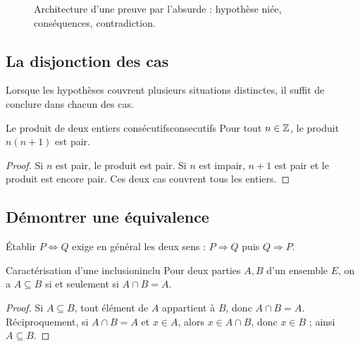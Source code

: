 \begin{figure}[htbp]\centering
{}
\caption{Architecture d'une preuve par l'absurde : hypothèse niée, conséquences, contradiction.}\label{fig:log:absurde}
\end{figure}

\subsection{La disjonction des cas}
Lorsque les hypothèses couvrent plusieurs situations distinctes, il suffit de conclure dans chacun des cas.
\begin{proposition}{Le produit de deux entiers consécutifs}{consecutifs}
Pour tout $n\in\mathbb Z$, le produit $n(n+1)$ est pair.
\end{proposition}
\begin{proof}
Si $n$ est pair, le produit est pair. Si $n$ est impair, $n+1$ est pair et le produit est encore pair. Ces deux cas couvrent tous les entiers.
\end{proof}

\subsection{Démontrer une équivalence}
Établir $P\Leftrightarrow Q$ exige en général les deux sens : $P\Rightarrow Q$ puis $Q\Rightarrow P$.
\begin{proposition}{Caractérisation d'une inclusion}{inclu}
Pour deux parties $A,B$ d'un ensemble $E$, on a $A\subseteq B$ si et seulement si $A\cap B=A$.
\end{proposition}
\begin{proof}
Si $A\subseteq B$, tout élément de $A$ appartient à $B$, donc $A\cap B=A$. Réciproquement, si $A\cap B=A$ et $x\in A$, alors $x\in A\cap B$, donc $x\in B$ ; ainsi $A\subseteq B$.
\end{proof}

